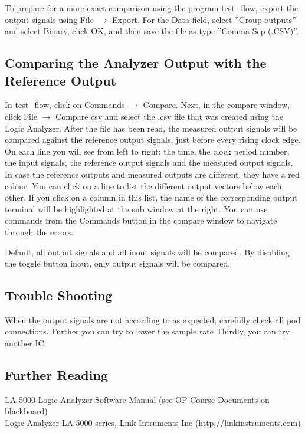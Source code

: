 To prepare for a more exact comparison using the program test\_flow, 
export the output signals using File $\rightarrow$ Export. 
For the Data field, select ''Group outputs'' and select Binary, click OK, and then save the file as 
type ''Comma Sep (.CSV)''.

\subsection{Comparing the Analyzer Output with the Reference Output}
In test\_flow, click on Commands $\rightarrow$ Compare. 
Next, in the compare window, click File $\rightarrow$ Compare csv and select
the .csv file that was created using the Logic Analyzer.
After the file has been read,
the measured output signals will be compared against the reference output signals,
just before every rising clock edge. 
On each line you will see from left to right: the time, the clock period number,
the input signals, the reference output signals and the measured output signals. 
In case the reference outputs and measured outputs are different, they have a 
red colour.  
You can click on a line to list the different output vectors below each other.  
If you click on a column in this list, the name of the corresponding output terminal will 
be highlighted at the sub window at the right. 
You can use commands from the 
Commands button in the compare window to navigate through the errors.

Default, all output signals and all inout signals will be compared.
By disabling the toggle button inout, only output signals will be compared.

\subsection{Trouble Shooting}
When the output signals are not according to as expected, carefully check all
pod connections. 
Further you can try to lower the sample rate
Thirdly, you can try another IC.

\subsection{Further Reading}
LA 5000 Logic Analyzer Software Manual (see OP Course Documents on blackboard) \\
Logic Analyzer LA-5000 series, Link Intruments Inc (http://linkinstruments.com)
\def\figurename{Figuur}
